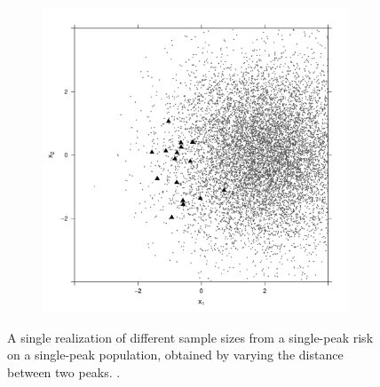 \begin{figure}[htbp]
\begin{subfigure}{0.45\textwidth}
        \includegraphics[width=\textwidth]{results/p1.4_100_1_1h_4s/output/population_and_incidents_scatter}
        \label{fig:one_sample:p1.4_100_Gap_risk:4}
    \end{subfigure}
    \caption[Examples showing distance between population and incident peaks]
        {A single realization of different sample sizes from a single-peak risk on a single-peak population, obtained by varying the distance between two peaks. \scatterplotcaption.}
    \label{fig:one_sample:p1.4_100_Gap_risk}
\end{figure}

